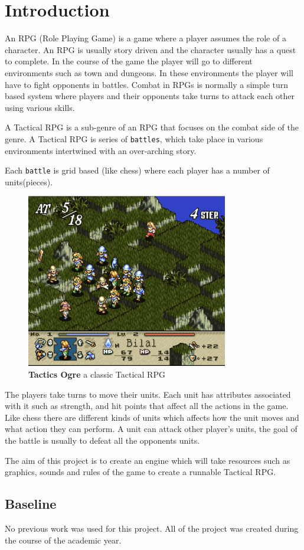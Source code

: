 \section{Introduction} 
\label{introduction}
       
An RPG (Role Playing Game) is a game where a player assumes the role of a character. An RPG is usually story driven and the character usually has a quest to complete. In the course of the game the player will go to different environments such as town and dungeons. In these environments the player will have to fight opponents in battles. Combat in RPGs is normally a simple turn based system where players and their opponents take turns to attack each other using various skills. 

A Tactical RPG is a sub-genre of an RPG that focuses on the combat side of the genre. A Tactical RPG is series of \texttt{battles}, which take place in various environments intertwined with an over-arching story.

Each \texttt{battle} is grid based (like chess) where each player has a number of units(pieces). 
\begin{figure}[htbp] \centering 
	\includegraphics[height=3in]{figures/TRPG.png} 
	\caption{\textbf{Tactics Ogre}\cite{to} a classic Tactical RPG } 
	\label{fig:TRPG} 
\end{figure}
The players take turns to move their units. Each unit has attributes associated with it such as strength, and hit points that affect all the actions in the game. Like chess there are different kinds of units which affects how the unit moves and what action they can perform. A unit can attack other player's units, the goal of the battle is usually to defeat all the opponents units.

The aim of this project is to create an engine which will take resources such as graphics, sounds and rules of the game to create a runnable Tactical RPG.

\subsection{Baseline} %
\label{sub:baseline}

No previous work was used for this project. All of the project was created during the course of the academic year.

